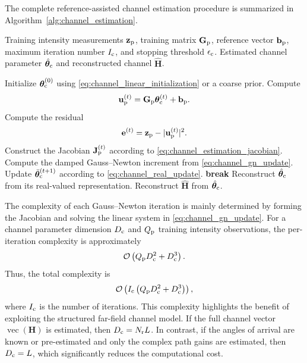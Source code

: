 \documentclass[journal]{IEEEtran}
\begin{document}
The complete reference-assisted channel estimation procedure is summarized in Algorithm~\ref{alg:channel_estimation}.

\begin{algorithm}[t]
\caption{Reference-Assisted Channel Estimation}
\label{alg:channel_estimation}
\begin{algorithmic}[1]
\REQUIRE Training intensity measurements $\mathbf{z}_{\rm p}$, training matrix $\mathbf{G}_{\rm p}$, reference vector $\mathbf{b}_{\rm p}$, maximum iteration number $I_{\rm c}$, and stopping threshold $\epsilon_{\rm c}$.
\ENSURE Estimated channel parameter $\hat{\boldsymbol{\theta}}_{\rm c}$ and reconstructed channel $\hat{\mathbf{H}}$.

\STATE Initialize $\boldsymbol{\theta}_{\rm c}^{(0)}$ using \eqref{eq:channel_linear_initialization} or a coarse prior.
    \STATE Compute
    \[
    \mathbf{u}_{\rm p}^{(t)}
    =
    \mathbf{G}_{\rm p}\boldsymbol{\theta}_{\rm c}^{(t)}
    +
    \mathbf{b}_{\rm p}.
    \]
    \STATE Compute the residual
    \[
    \mathbf{e}^{(t)}
    =
    \mathbf{z}_{\rm p}
    -
    |\mathbf{u}_{\rm p}^{(t)}|^2.
    \]
    \STATE Construct the Jacobian $\mathbf{J}_{\rm p}^{(t)}$ according to \eqref{eq:channel_estimation_jacobian}.
    \STATE Compute the damped Gauss--Newton increment from \eqref{eq:channel_gn_update}.
    \STATE Update $\bar{\boldsymbol{\theta}}_{\rm c}^{(t+1)}$ according to \eqref{eq:channel_real_update}.
        \STATE \textbf{break}
    \ENDIF
\ENDFOR
\STATE Reconstruct $\hat{\boldsymbol{\theta}}_{\rm c}$ from its real-valued representation.
\STATE Reconstruct $\hat{\mathbf{H}}$ from $\hat{\boldsymbol{\theta}}_{\rm c}$.
\end{algorithmic}
\end{algorithm}

The complexity of each Gauss--Newton iteration is mainly determined by forming the Jacobian and solving the linear system in \eqref{eq:channel_gn_update}. 
For a channel parameter dimension $D_{\rm c}$ and $Q_{\rm p}$ training intensity observations, the per-iteration complexity is approximately
\begin{equation}
\mathcal{O}
\left(
Q_{\rm p}D_{\rm c}^{2}
+
D_{\rm c}^{3}
\right).
\label{eq:channel_estimation_complexity}
\end{equation}
Thus, the total complexity is
\begin{equation}
\mathcal{O}
\left(
I_{\rm c}
\left(
Q_{\rm p}D_{\rm c}^{2}
+
D_{\rm c}^{3}
\right)
\right),
\end{equation}
where $I_{\rm c}$ is the number of iterations. 
This complexity highlights the benefit of exploiting the structured far-field channel model. 
If the full channel vector $\operatorname{vec}(\mathbf{H})$ is estimated, then $D_{\rm c}=N_{\rm r}L$. 
In contrast, if the angles of arrival are known or pre-estimated and only the complex path gains are estimated, then $D_{\rm c}=L$, which significantly reduces the computational cost.
\end{document}
